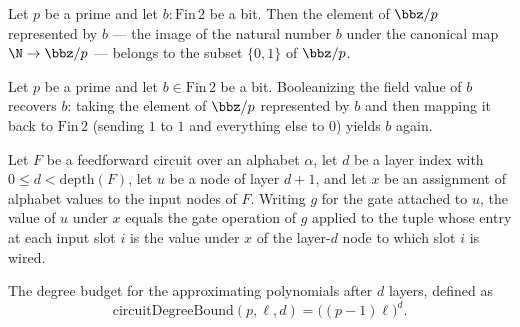 \begin{lemma}
\label{RazborovSmolensky.boolVal_mem}
\leanok
{}
Let $p$ be a prime and let $b : \mathrm{Fin}\,2$ be a bit. Then the element of $\bbz/p$
represented by $b$ — the image of the natural number $b$ under the canonical map $\N \to
\bbz/p$ — belongs to the subset $\{0,1\}$ of $\bbz/p$.
\end{lemma}

\begin{lemma}
\label{RazborovSmolensky.bitify_boolVal}
\leanok
{}
Let $p$ be a prime and let $b \in \mathrm{Fin}\,2$ be a bit. Booleanizing the field
value of $b$ recovers $b$: taking the element of $\bbz/p$ represented by $b$ and then
mapping it back to $\mathrm{Fin}\,2$ (sending $1$ to $1$ and everything else to $0$)
yields $b$ again.
\end{lemma}

\begin{lemma}
\label{RazborovSmolensky.evalNode_succ_eq}
\leanok
{}
Let $F$ be a feedforward circuit over an alphabet $\alpha$, let $d$ be a layer index
with $0 \le d < \mathrm{depth}(F)$, let $u$ be a node of layer $d+1$, and let $x$ be an
assignment of alphabet values to the input nodes of $F$. Writing $g$ for the gate
attached to $u$, the value of $u$ under $x$ equals the gate operation of $g$ applied to
the tuple whose entry at each input slot $i$ is the value under $x$ of the layer-$d$
node to which slot $i$ is wired.
\end{lemma}

\begin{definition}
\label{RazborovSmolensky.circuitDegreeBound}
\leanok
The degree budget for the approximating polynomials after $d$ layers, defined as
\[
\mathrm{circuitDegreeBound}(p,\ell,d) = \bigl((p-1)\ell\bigr)^{d}.
\]
\end{definition}


